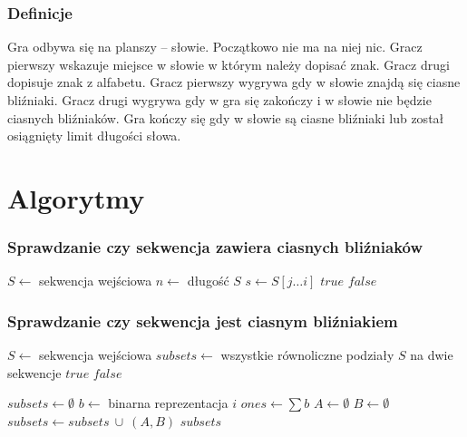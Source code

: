 \documentclass{beamer}
\begin{document}
\begin{frame}
\frametitle{Definicje}
Gra odbywa się na planszy -- słowie. Początkowo nie ma na niej nic.
Gracz pierwszy wskazuje miejsce w słowie w którym należy dopisać znak.
Gracz drugi dopisuje znak z alfabetu. Gracz pierwszy wygrywa
gdy w słowie znajdą się ciasne bliźniaki.
Gracz drugi wygrywa gdy w gra się zakończy i w słowie nie będzie ciasnych
bliźniaków.
Gra kończy się gdy w słowie są ciasne bliźniaki lub
został osiągnięty limit długości słowa.
\end{frame}

\section{Algorytmy}

\begin{frame}
\frametitle{Sprawdzanie czy sekwencja zawiera ciasnych bliźniaków}

\begin{algorithmic}
\State $S \gets $ sekwencja wejściowa
\State $n \gets $ długość $S$
		\State $s \gets S[j \dots i]$
			\State
		    \Return $true$
	    \EndIf
	\EndFor
\EndFor
\State
\Return $false$
\end{algorithmic}
\end{frame}

\begin{frame}
\frametitle{Sprawdzanie czy sekwencja jest ciasnym bliźniakiem}

\begin{algorithmic}
\State $S \gets $ sekwencja wejściowa
\State $subsets \gets $ wszystkie równoliczne podziały $S$ na dwie sekwencje
			\State
		    \Return $true$
	    \EndIf
\EndFor
\State
\Return $false$
\end{algorithmic}

\end{frame}

\begin{frame}
\begin{algorithmic}
\State $subsets \gets \emptyset$
		\State $b \gets $ binarna reprezentacja $i$
		\State $ones \gets \sum b $ 
			\State $A \gets \emptyset$
			\State $B \gets \emptyset$
					\State
				\Else
					\State
				\EndIf
			\EndFor
			\State $subsets \gets subsets ~ \cup ~ (A,B)$
	    \EndIf
\EndFor
\State
\Return $subsets$
\end{algorithmic}

\end{frame}
\end{document}
